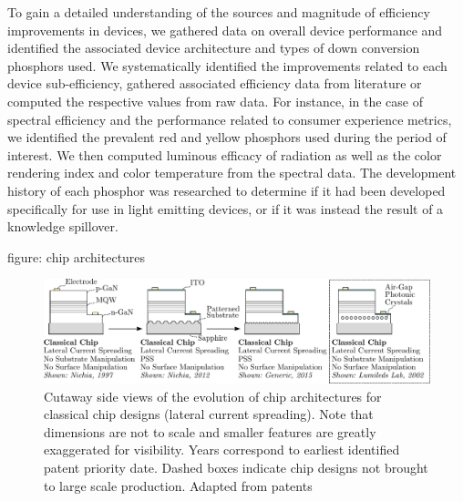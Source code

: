 \documentclass[a4paper,nocompress]{spie}  %
\begin{document}
To gain a detailed understanding of the sources and magnitude of efficiency improvements in devices, we gathered data on overall device performance and identified the associated device architecture and types of down conversion phosphors used. We systematically identified the improvements related to each device sub-efficiency, gathered associated efficiency data from literature or computed the respective values from raw data.
For instance, in the case of spectral efficiency and the performance related to consumer experience metrics, we identified the prevalent red and yellow phosphors used during the period of interest. We then computed luminous efficacy of radiation as well as the color rendering index and color temperature from the spectral data. The development history of each phosphor was researched to determine if it had been developed specifically for use in light emitting devices, or if it was instead the result of a knowledge spillover.


figure: chip architectures
\begin{figure} [ht]
    \begin{center}
        \includegraphics[width=\textwidth]{SPIE/article/chip_architectures.pdf}
    \end{center}
    \caption{Cutaway side views of the evolution of chip architectures for classical chip designs (lateral current spreading). Note that dimensions are not to scale and smaller features are greatly exaggerated for visibility. Years correspond to earliest identified patent priority date. Dashed boxes indicate chip designs not brought to large scale production. Adapted from patents \cite{nagahama2013nitride}\cite{tanaka2010semiconductor}\cite{wierer2006photonic}}
    \label{fig:chip_arch}
\end{figure}
\end{document}
